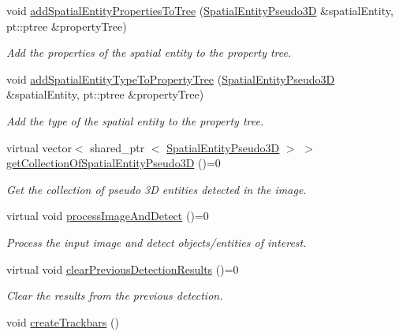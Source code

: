 \begin{DoxyCompactItemize}
void \hyperlink{classmultiscale_1_1analysis_1_1Detector_ac0e3077d43c329e409db504bf3981c3c}{add\-Spatial\-Entity\-Properties\-To\-Tree} (\hyperlink{classmultiscale_1_1analysis_1_1SpatialEntityPseudo3D}{\-Spatial\-Entity\-Pseudo3\-D} \&spatial\-Entity, pt\-::ptree \&property\-Tree)
\begin{DoxyCompactList}\small\item\em \-Add the properties of the spatial entity to the property tree. \end{DoxyCompactList}\item 
void \hyperlink{classmultiscale_1_1analysis_1_1Detector_ae166867e5af40637dbde9ac0da6dac9a}{add\-Spatial\-Entity\-Type\-To\-Property\-Tree} (\hyperlink{classmultiscale_1_1analysis_1_1SpatialEntityPseudo3D}{\-Spatial\-Entity\-Pseudo3\-D} \&spatial\-Entity, pt\-::ptree \&property\-Tree)
\begin{DoxyCompactList}\small\item\em \-Add the type of the spatial entity to the property tree. \end{DoxyCompactList}\item 
virtual vector$<$ shared\-\_\-ptr\*
$<$ \hyperlink{classmultiscale_1_1analysis_1_1SpatialEntityPseudo3D}{\-Spatial\-Entity\-Pseudo3\-D} $>$ $>$ \hyperlink{classmultiscale_1_1analysis_1_1Detector_a684a7071aca4173e3dc968d8635bd92a}{get\-Collection\-Of\-Spatial\-Entity\-Pseudo3\-D} ()=0
\begin{DoxyCompactList}\small\item\em \-Get the collection of pseudo 3\-D entities detected in the image. \end{DoxyCompactList}\item 
virtual void \hyperlink{classmultiscale_1_1analysis_1_1Detector_a7451855e415300f15765082f21588f13}{process\-Image\-And\-Detect} ()=0
\begin{DoxyCompactList}\small\item\em \-Process the input image and detect objects/entities of interest. \end{DoxyCompactList}\item 
virtual void \hyperlink{classmultiscale_1_1analysis_1_1Detector_a3c2add35193ad09a0200003d0053da6b}{clear\-Previous\-Detection\-Results} ()=0
\begin{DoxyCompactList}\small\item\em \-Clear the results from the previous detection. \end{DoxyCompactList}\item 
void \hyperlink{classmultiscale_1_1analysis_1_1Detector_a3d406aaa4dc8e9f8adbee3d7818cf1de}{create\-Trackbars} ()

\end{DoxyCompactItemize}
